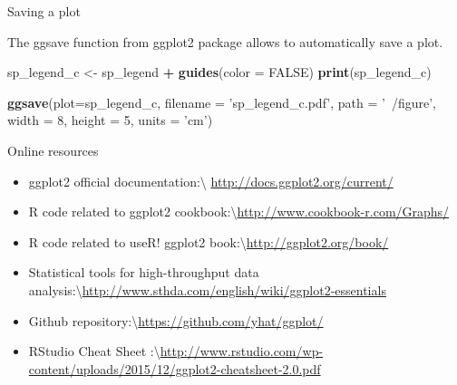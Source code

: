 \documentclass[
  ignorenonframetext,
]{beamer}
\newenvironment{Shaded}{\begin{snugshade}}{\end{snugshade}}
\newcommand{\DataTypeTok}[1]{\textcolor[rgb]{0.13,0.29,0.53}{#1}}
\newcommand{\DecValTok}[1]{\textcolor[rgb]{0.00,0.00,0.81}{#1}}
\newcommand{\KeywordTok}[1]{\textcolor[rgb]{0.13,0.29,0.53}{\textbf{#1}}}
\newcommand{\NormalTok}[1]{#1}
\newcommand{\OperatorTok}[1]{\textcolor[rgb]{0.81,0.36,0.00}{\textbf{#1}}}
\newcommand{\OtherTok}[1]{\textcolor[rgb]{0.56,0.35,0.01}{#1}}
\newcommand{\StringTok}[1]{\textcolor[rgb]{0.31,0.60,0.02}{#1}}
\providecommand{\tightlist}{%
  \setlength{\itemsep}{0pt}\setlength{\parskip}{0pt}}
\begin{document}
\begin{frame}[fragile]{Saving a plot}
\protect\hypertarget{saving-a-plot}{}

The ggsave function from ggplot2 package allows to automatically save a
plot.

\begin{Shaded}
\begin{Highlighting}[]
\NormalTok{sp_legend_c <-}\StringTok{ }\NormalTok{sp_legend }\OperatorTok{+}\StringTok{ }
\StringTok{  }\KeywordTok{guides}\NormalTok{(}\DataTypeTok{color =} \OtherTok{FALSE}\NormalTok{)}
\KeywordTok{print}\NormalTok{(sp_legend_c)}

\KeywordTok{ggsave}\NormalTok{(}\DataTypeTok{plot=}\NormalTok{sp_legend_c, }\DataTypeTok{filename =} \StringTok{'sp_legend_c.pdf'}\NormalTok{, }\DataTypeTok{path =} \StringTok{'~/figure'}\NormalTok{,}
       \DataTypeTok{width =} \DecValTok{8}\NormalTok{, }\DataTypeTok{height =} \DecValTok{5}\NormalTok{, }\DataTypeTok{units =} \StringTok{'cm'}\NormalTok{)}
\end{Highlighting}
\end{Shaded}

\end{frame}

\begin{frame}{Online resources}
\protect\hypertarget{online-resources}{}

\begin{itemize}
\tightlist
\item
  ggplot2 official documentation:\textbackslash{}
  \url{http://docs.ggplot2.org/current/}
\item
  R code related to ggplot2
  cookbook:\textbackslash{}\url{http://www.cookbook-r.com/Graphs/}
\item
  R code related to useR! ggplot2
  book:\textbackslash{}\url{http://ggplot2.org/book/}
\item
  Statistical tools for high-throughput data
  analysis:\textbackslash{}\url{http://www.sthda.com/english/wiki/ggplot2-essentials}
\item
  Github
  repository:\textbackslash{}\url{https://github.com/yhat/ggplot/}
\item
  RStudio Cheat Sheet
  :\textbackslash{}\url{http://www.rstudio.com/wp-content/uploads/2015/12/ggplot2-cheatsheet-2.0.pdf}
\end{itemize}

\end{frame}
\end{document}
